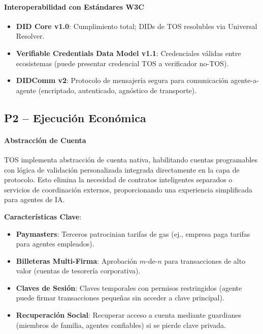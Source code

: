 \documentclass[11pt]{article}
\begin{document}
\paragraph{Interoperabilidad con Estándares W3C}
\begin{itemize}[noitemsep]
  \item \textbf{DID Core v1.0}: Cumplimiento total; DIDs de TOS resolubles via Universal Resolver.
  \item \textbf{Verifiable Credentials Data Model v1.1}: Credenciales válidas entre ecosistemas (puede presentar credencial TOS a verificador no-TOS).
  \item \textbf{DIDComm v2}: Protocolo de mensajería segura para comunicación agente-a-agente (encriptado, autenticado, agnóstico de transporte).
\end{itemize}

\subsection{P2 -- Ejecución Económica}
\label{sec:pillar-economic}

\paragraph{Abstracción de Cuenta}
TOS implementa abstracción de cuenta nativa, habilitando cuentas programables con lógica de validación personalizada integrada directamente en la capa de protocolo. Esto elimina la necesidad de contratos inteligentes separados o servicios de coordinación externos, proporcionando una experiencia simplificada para agentes de IA.

\textbf{Características Clave}:
\begin{itemize}[noitemsep]
  \item \textbf{Paymasters}: Terceros patrocinian tarifas de gas (ej., empresa paga tarifas para agentes empleados).
  \item \textbf{Billeteras Multi-Firma}: Aprobación $m$-de-$n$ para transacciones de alto valor (cuentas de tesorería corporativa).
  \item \textbf{Claves de Sesión}: Claves temporales con permisos restringidos (agente puede firmar transacciones pequeñas sin acceder a clave principal).
  \item \textbf{Recuperación Social}: Recuperar acceso a cuenta mediante guardianes (miembros de familia, agentes confiables) si se pierde clave privada.
\end{itemize}
\end{document}
